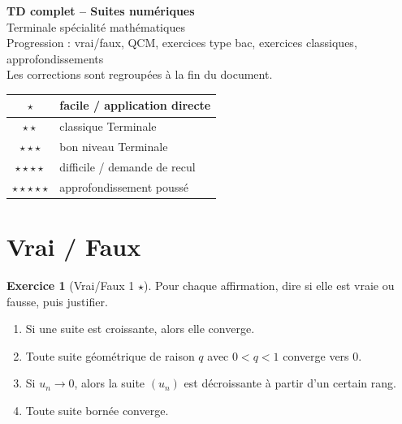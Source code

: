 \documentclass[11pt,a4paper]{article}
\theoremstyle{definition}
\newtheorem{exercice}{Exercice}[section]
\newcommand{\etoile}[1]{\hfill{\small\textbf{#1}}}
\begin{document}
\begin{center}
    {\LARGE \textbf{TD complet -- Suites numériques}}\\[0.2cm]
    {\large Terminale spécialité mathématiques}\\[0.2cm]
    {\small Progression : vrai/faux, QCM, exercices type bac, exercices classiques, approfondissements}\\[0.2cm]
    {\small Les corrections sont regroupées à la fin du document.}
\end{center}

\vspace{0.3cm}

\begin{center}
\renewcommand{\arraystretch}{1.3}
\begin{tabular}{|c|l|}
\hline
$\star$ & facile / application directe \\
\hline
$\star\star$ & classique Terminale \\
\hline
$\star\star\star$ & bon niveau Terminale \\
\hline
$\star\star\star\star$ & difficile / demande de recul \\
\hline
$\star\star\star\star\star$ & approfondissement poussé \\
\hline
\end{tabular}
\end{center}

\tableofcontents
\newpage

\section{Vrai / Faux}

\begin{exercice}[Vrai/Faux 1 \etoile{$\star$}]
Pour chaque affirmation, dire si elle est vraie ou fausse, puis justifier.
\begin{enumerate}[label=\alph*)]
    \item Si une suite est croissante, alors elle converge.
    \item Toute suite géométrique de raison $q$ avec $0<q<1$ converge vers $0$.
    \item Si $u_n \to 0$, alors la suite $(u_n)$ est décroissante à partir d'un certain rang.
    \item Toute suite bornée converge.
\end{enumerate}
\end{exercice}
\end{document}
